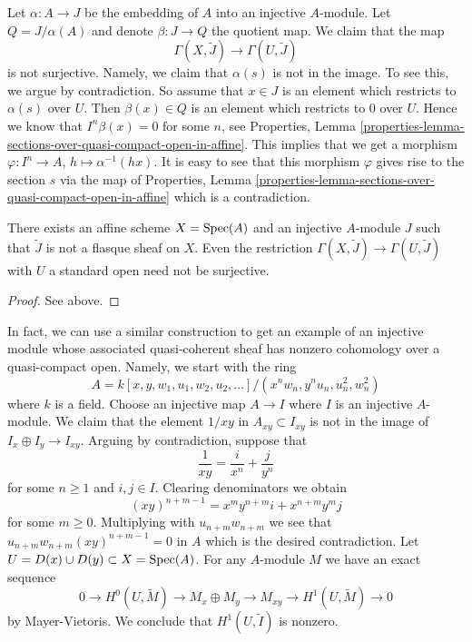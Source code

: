 \medskip\noindent
Let $\alpha : A \to J$ be the embedding of $A$ into an injective $A$-module.
Let $Q = J/\alpha(A)$ and denote $\beta : J \to Q$ the quotient map.
We claim that the map
$$
\Gamma(X, \widetilde{J})
\longrightarrow
\Gamma(U, \widetilde{J})
$$
is not surjective. Namely, we claim that $\alpha(s)$ is not in the image.
To see this, we argue by contradiction. So assume that $x \in J$ is an
element which restricts to $\alpha(s)$ over $U$. Then $\beta(x) \in Q$
is an element which restricts to $0$ over $U$. Hence we know that
$I^n\beta(x) = 0$ for some $n$, see
Properties,
Lemma \ref{properties-lemma-sections-over-quasi-compact-open-in-affine}.
This implies that we get a morphism
$\varphi : I^n \to A$, $h \mapsto \alpha^{-1}(hx)$. It is easy to see that
this morphism $\varphi$ gives rise to the section $s$ via the map of
Properties,
Lemma \ref{properties-lemma-sections-over-quasi-compact-open-in-affine}
which is a contradiction.

\begin{lemma}
\label{lemma-nonflasque}
There exists an affine scheme $X = \mathop{\mathrm{Spec}}(A)$ and an injective
$A$-module $J$ such that $\widetilde{J}$ is not a flasque sheaf on $X$.
Even the restriction $\Gamma(X, \widetilde{J}) \to \Gamma(U, \widetilde{J})$
with $U$ a standard open need not be surjective.
\end{lemma}

\begin{proof}
See above.
\end{proof}

\noindent
In fact, we can use a similar construction to get an example of an
injective module whose associated quasi-coherent sheaf has nonzero
cohomology over a quasi-compact open. Namely, we start with the ring
$$
A = k[x, y, w_1, u_1, w_2, u_2, \ldots]/(x^nw_n, y^nu_n, u_n^2, w_n^2)
$$
where $k$ is a field. Choose an injective map $A \to I$ where $I$ is an
injective $A$-module. We claim that the element $1/xy$ in
$A_{xy} \subset I_{xy}$ is not in the image of $I_x \oplus I_y \to I_{xy}$.
Arguing by contradiction, suppose that
$$
\frac{1}{xy} = \frac{i}{x^n} + \frac{j}{y^n}
$$
for some $n \geq 1$ and $i, j \in I$. Clearing denominators we obtain
$$
(xy)^{n + m - 1} = x^my^{n + m}i + x^{n + m}y^mj
$$
for some $m \geq 0$. Multiplying with $u_{n + m}w_{n + m}$ we see
that $u_{n + m}w_{n + m}(xy)^{n + m - 1} = 0$ in $A$ which is the
desired contradiction.
Let $U = D(x) \cup D(y) \subset X = \mathop{\mathrm{Spec}}(A)$. For any $A$-module
$M$ we have an exact sequence
$$
0 \to H^0(U, \widetilde{M}) \to M_x \oplus M_y \to M_{xy} \to
H^1(U, \widetilde{M}) \to 0
$$
by Mayer-Vietoris. We conclude that $H^1(U, \widetilde{I})$ is nonzero.

